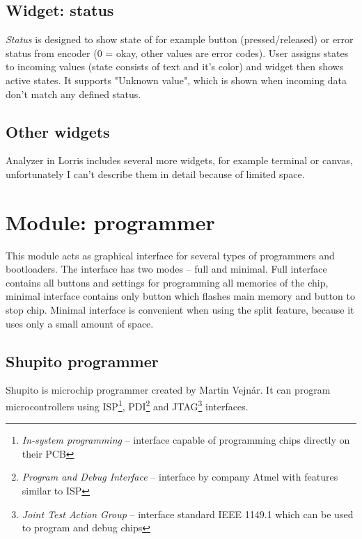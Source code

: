 \documentclass[12pt, a4paper, oneside]{article}
\newcommand{\It}{\textit}  %
\begin{document}
\subsection{Widget: status}
\It{Status} is designed to show state of for example button (pressed/released) or error status from encoder (0 = okay, other values are error codes). User assigns states to incoming values (state consists of text and it's color) and widget then shows active states. It supports "Unknown value", which is shown when incoming data don't match any defined status.

\subsection{Other widgets}
Analyzer in Lorris includes several more widgets, for example terminal or canvas, unfortunately I can't describe them in detail because of limited space.

% 

\section{Module: programmer}
This module acts as graphical interface for several types of programmers and bootloaders. The interface has two modes -- full and minimal. Full interface contains all buttons and settings for programming all memories of the chip, minimal interface contains only button which flashes main memory and button to stop chip. Minimal interface is convenient when using the split feature, because it uses only a small amount of space.

\subsection{Shupito programmer}
Shupito is microchip programmer created by Martin Vejnár. It can program microcontrollers using ISP\footnote{\It{In-system programming} -- interface capable of programming chips directly on their PCB}, PDI\footnote{\It{Program and Debug Interface} -- interface by company Atmel with features similar to ISP} and JTAG\footnote{\It{Joint Test Action Group} -- interface standard IEEE 1149.1 which can be used to program and debug chips} interfaces.
\end{document}
